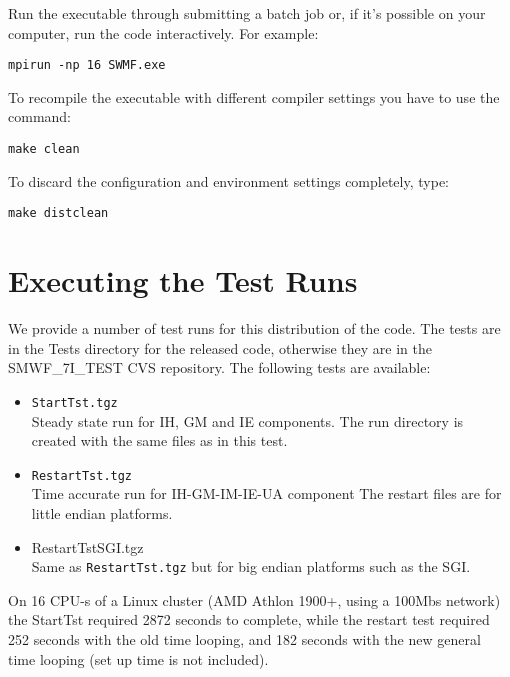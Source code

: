 Run the executable through submitting a batch job or, if it's possible 
on your computer, run the code interactively.  For example:
\begin{verbatim}
mpirun -np 16 SWMF.exe
\end{verbatim}

To recompile the executable with different compiler settings you have
to use the command:
\begin{verbatim}
make clean
\end{verbatim} 

To discard the configuration and environment settings completely,
type:
\begin{verbatim}
make distclean
\end{verbatim} 

\section{Executing the Test Runs}

We provide a number of test runs for this distribution of the code.
The tests are in the Tests directory for the released code, otherwise
they are in the SMWF\_7I\_TEST CVS repository.  The following tests
are available:
\begin{itemize}
\item {\tt StartTst.tgz}\\
      Steady state run for IH, GM and IE components.
      The run directory is created with the same files as in
      this test.

\item {\tt RestartTst.tgz}\\
      Time accurate run for IH-GM-IM-IE-UA component
      The restart files are for little endian platforms.

\item {RestartTstSGI.tgz}\\
      Same as {\tt RestartTst.tgz} 
      but for big endian platforms such as the SGI.
\end{itemize}
On 16 CPU-s of a Linux cluster (AMD Athlon 1900+, using a 100Mbs
network) the StartTst required 2872 seconds to complete, while the
restart test required 252 seconds with the old time looping, and 182
seconds with the new general time looping (set up time is not
included).

